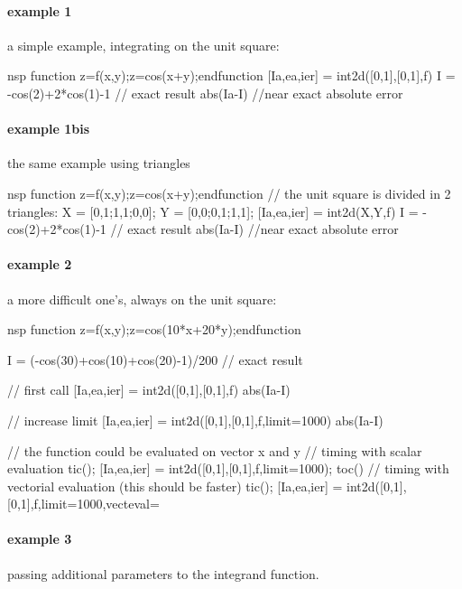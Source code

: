 \begin{examples}
  
\paragraph{example 1} a simple example, integrating on the unit square: 
\begin{mintednsp}{nsp}
function z=f(x,y);z=cos(x+y);endfunction
[Ia,ea,ier] = int2d([0,1],[0,1],f) 
I = -cos(2)+2*cos(1)-1 // exact result  
abs(Ia-I) //near exact absolute error
\end{mintednsp}

\paragraph{example 1bis} the same example using triangles
\begin{mintednsp}{nsp}
function z=f(x,y);z=cos(x+y);endfunction
// the unit square is divided in 2 triangles:
X = [0,1;1,1;0,0];
Y = [0,0;0,1;1,1];
[Ia,ea,ier] = int2d(X,Y,f)
I = -cos(2)+2*cos(1)-1 // exact result  
abs(Ia-I) //near exact absolute error
\end{mintednsp}
  
\paragraph{example 2} a more difficult one's, always on the unit square:
\begin{mintednsp}{nsp}
function z=f(x,y);z=cos(10*x+20*y);endfunction

I = (-cos(30)+cos(10)+cos(20)-1)/200 // exact result  

// first call 
[Ia,ea,ier] = int2d([0,1],[0,1],f)
abs(Ia-I)

// increase limit
[Ia,ea,ier] = int2d([0,1],[0,1],f,limit=1000)
abs(Ia-I)

// the function could be evaluated on vector x and y
// timing with scalar evaluation
tic(); [Ia,ea,ier] = int2d([0,1],[0,1],f,limit=1000); toc()
// timing with vectorial evaluation (this should be faster)
tic(); [Ia,ea,ier] = int2d([0,1],[0,1],f,limit=1000,vecteval=%
\end{mintednsp}
  
\paragraph{example 3} passing additional parameters to the integrand function.


\end{examples}
